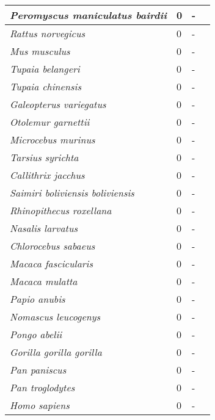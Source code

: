 {\begin{longtable}{| L{4cm} | L{2cm}  | L{5cm} | L{4cm} |}
\textit{Peromyscus maniculatus bairdii} & 0 & - & \\ \hline
\textit{Rattus norvegicus} & 0 & - & \\ \hline
\textit{Mus musculus} & 0 & - & \\ \hline
\textit{Tupaia belangeri} & 0 & - & \\ \hline
\textit{Tupaia chinensis} & 0 & - & \\ \hline
\textit{Galeopterus variegatus} & 0 & - & \\ \hline
\textit{Otolemur garnettii} & 0 & - & \\ \hline
\textit{Microcebus murinus} & 0 & - & \\ \hline
\textit{Tarsius syrichta} & 0 & - & \\ \hline
\textit{Callithrix jacchus} & 0 & - & \\ \hline
\textit{Saimiri boliviensis boliviensis} & 0 & - & \\ \hline
\textit{Rhinopithecus roxellana} & 0 & - & \\ \hline
\textit{Nasalis larvatus} & 0 & - & \\ \hline
\textit{Chlorocebus sabaeus} & 0 & - & \\ \hline
\textit{Macaca fascicularis} & 0 & - & \\ \hline
\textit{Macaca mulatta} & 0 & - & \\ \hline
\textit{Papio anubis} & 0 & - & \\ \hline
\textit{Nomascus leucogenys} & 0 & - & \\ \hline
\textit{Pongo abelii} & 0 & - & \\ \hline
\textit{Gorilla gorilla gorilla} & 0 & - & \\ \hline
\textit{Pan paniscus} & 0 & - & \\ \hline
\textit{Pan troglodytes} & 0 & - & \\ \hline
\textit{Homo sapiens} & 0 & - & \\ \hline


\end{longtable}}
